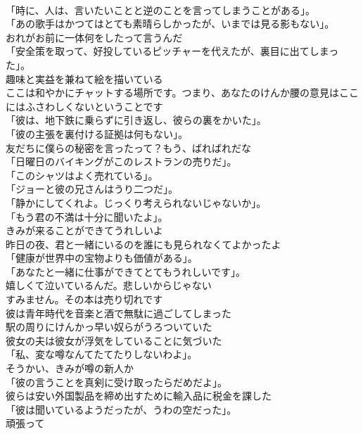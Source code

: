 \documentclass[8pt]{extreport}
\begin{document}
\begin{CJK}{UTF8}{min}
\\	「時に、人は、言いたいことと逆のことを言ってしまうことがある」。	
\\	「あの歌手はかつてはとても素晴らしかったが、いまでは見る影もない」。	
\\	おれがお前に一体何をしたって言うんだ	
\\	「安全策を取って、好投しているピッチャーを代えたが、裏目に出てしまった」。	
\\	趣味と実益を兼ねて絵を描いている	
\\	ここは和やかにチャットする場所です。つまり、あなたのけんか腰の意見はここにはふさわしくないということです	
\\	「彼は、地下鉄に乗らずに引き返し、彼らの裏をかいた」。	
\\	「彼の主張を裏付ける証拠は何もない」。	
\\	友だちに僕らの秘密を言ったって？もう、ばればれだな	
\\	「日曜日のバイキングがこのレストランの売りだ」。	
\\	「このシャツはよく売れている」。	
\\	「ジョーと彼の兄さんはうり二つだ」。	
\\	「静かにしてくれよ。じっくり考えられないじゃないか」。	
\\	「もう君の不満は十分に聞いたよ」。	
\\	きみが来ることができてうれしいよ	
\\	昨日の夜、君と一緒にいるのを誰にも見られなくてよかったよ	
\\	「健康が世界中の宝物よりも価値がある」。	
\\	「あなたと一緒に仕事ができてとてもうれしいです」。	
\\	嬉しくて泣いているんだ。悲しいからじゃない	
\\	すみません。その本は売り切れです	
\\	彼は青年時代を音楽と酒で無駄に過ごしてしまった	
\\	駅の周りにけんかっ早い奴らがうろついていた	
\\	彼女の夫は彼女が浮気をしていることに気づいた	
\\	「私、変な噂なんてたてたりしないわよ」。	
\\	そうかい、きみが噂の新人か	
\\	「彼の言うことを真剣に受け取ったらだめだよ」。	
\\	彼らは安い外国製品を締め出すために輸入品に税金を課した	
\\	「彼は聞いているようだったが、うわの空だった」。	
\\	頑張って	

\end{CJK}
\end{document}
